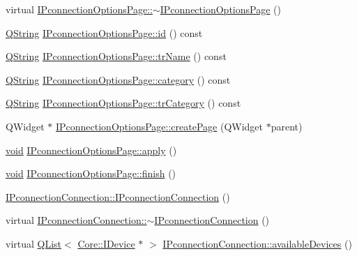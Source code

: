 \begin{DoxyCompactItemize}
\item 
virtual \hyperlink{group___i_p_conn_plugin_ga3b3b7d2dfd99db070bc9e3bebfaee3aa}{I\-Pconnection\-Options\-Page\-::$\sim$\-I\-Pconnection\-Options\-Page} ()
\item 
\hyperlink{group___u_a_v_objects_plugin_gab9d252f49c333c94a72f97ce3105a32d}{Q\-String} \hyperlink{group___i_p_conn_plugin_ga4e312ba72e8ed237e148f6f2fd3bfd3f}{I\-Pconnection\-Options\-Page\-::id} () const 
\item 
\hyperlink{group___u_a_v_objects_plugin_gab9d252f49c333c94a72f97ce3105a32d}{Q\-String} \hyperlink{group___i_p_conn_plugin_gaf5ef5d6b22e3098d76849cf94feeb35c}{I\-Pconnection\-Options\-Page\-::tr\-Name} () const 
\item 
\hyperlink{group___u_a_v_objects_plugin_gab9d252f49c333c94a72f97ce3105a32d}{Q\-String} \hyperlink{group___i_p_conn_plugin_ga74c9ab9f46cce418606d0ee3fc3491a0}{I\-Pconnection\-Options\-Page\-::category} () const 
\item 
\hyperlink{group___u_a_v_objects_plugin_gab9d252f49c333c94a72f97ce3105a32d}{Q\-String} \hyperlink{group___i_p_conn_plugin_gace8ed46c336f3ee28ed2afeae6088da2}{I\-Pconnection\-Options\-Page\-::tr\-Category} () const 
\item 
Q\-Widget $\ast$ \hyperlink{group___i_p_conn_plugin_gabfa6c9961024b87e52e12a8e7145e4f6}{I\-Pconnection\-Options\-Page\-::create\-Page} (Q\-Widget $\ast$parent)
\item 
\hyperlink{group___u_a_v_objects_plugin_ga444cf2ff3f0ecbe028adce838d373f5c}{void} \hyperlink{group___i_p_conn_plugin_gab7a01d955726b8a348fd5b7ee7ed1406}{I\-Pconnection\-Options\-Page\-::apply} ()
\item 
\hyperlink{group___u_a_v_objects_plugin_ga444cf2ff3f0ecbe028adce838d373f5c}{void} \hyperlink{group___i_p_conn_plugin_gad905bf02420acad58a684461d456bd09}{I\-Pconnection\-Options\-Page\-::finish} ()
\item 
\hyperlink{group___i_p_conn_plugin_ga5eedabe97b32eaee1617cc040476a4b9}{I\-Pconnection\-Connection\-::\-I\-Pconnection\-Connection} ()
\item 
virtual \hyperlink{group___i_p_conn_plugin_ga003fc5feae8a88f8a1ad994b5b688f6e}{I\-Pconnection\-Connection\-::$\sim$\-I\-Pconnection\-Connection} ()
\item 
virtual \hyperlink{class_q_list}{Q\-List}$<$ \hyperlink{class_core_1_1_i_device}{Core\-::\-I\-Device} $\ast$ $>$ \hyperlink{group___i_p_conn_plugin_ga046ba69036aa4661e97da3c8fbb13850}{I\-Pconnection\-Connection\-::available\-Devices} ()
\item 

\end{DoxyCompactItemize}

